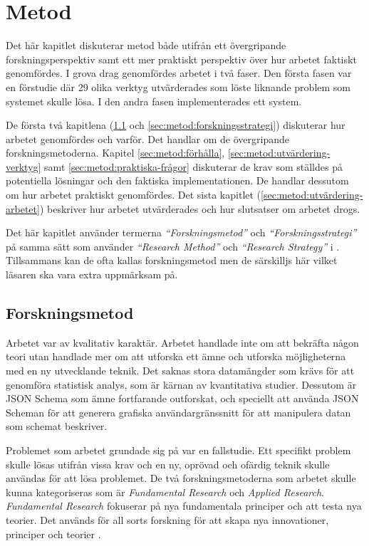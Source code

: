 \chapter{Metod}
\label{sec:metod}

Det här kapitlet diskuterar metod både utifrån ett övergripande forskningsperspektiv samt ett mer praktiskt perspektiv över hur arbetet faktiskt genomfördes. I grova drag genomfördes arbetet i två faser. Den första fasen var en förstudie där 29 olika verktyg utvärderades som löste liknande problem som systemet skulle lösa. I den andra fasen implementerades ett system.

De första två kapitlena (\ref{sec:metod:forskningsmetod} och \ref{sec:metod:forskningsstrategi}) diskuterar hur arbetet genomfördes och varför. Det handlar om de övergripande forskningsmetoderna. Kapitel \ref{sec:metod:förhålla}, \ref{sec:metod:utvärdering-verktyg} samt \ref{sec:metod:praktiska-frågor} diskuterar de krav som ställdes på potentiella lösningar och den faktiska implementationen. De handlar dessutom om hur arbetet praktiskt genomfördes. Det sista kapitlet (\ref{sec:metod:utvärdering-arbetet}) beskriver hur arbetet utvärderades och hur slutsatser om arbetet drogs.

Det här kapitlet använder termerna \textit{``Forskningsmetod''} och \textit{``Forskningsstrategi''} på samma sätt som \citeauthor{Hakansson} använder \textit{``Research Method''} och \textit{``Research Strategy''} i \textit{}. Tillsammans kan de ofta kallas forskningsmetod men de särskilljs här vilket läsaren ska vara extra uppmärksam på.

\section{Forskningsmetod}
\label{sec:metod:forskningsmetod}
Arbetet var av kvalitativ karaktär. Arbetet handlade inte om att bekräfta någon teori utan handlade mer om att utforska ett ämne och utforska möjligheterna med en ny utvecklande teknik. Det saknas stora datamängder som krävs för att genomföra statistisk analys, som är kärnan av kvantitativa studier. Dessutom är JSON Schema som ämne fortfarande outforskat, och speciellt att använda JSON Scheman för att generera grafiska användargränssnitt för att manipulera datan som schemat beskriver.

Problemet som arbetet grundade sig på var en fallstudie. Ett specifikt problem skulle lösas utifrån vissa krav och en ny, oprövad och ofärdig teknik skulle användas för att lösa problemet. De två forskningsmetoderna som arbetet skulle kunna kategoriseras som är \textit{Fundamental Research} och \textit{Applied Research}. \textit{Fundamental Research} fokuserar på nya fundamentala principer och att testa nya teorier. Det används för all sorts forskning för att skapa nya innovationer, principer och teorier \cite{Hakansson}.

